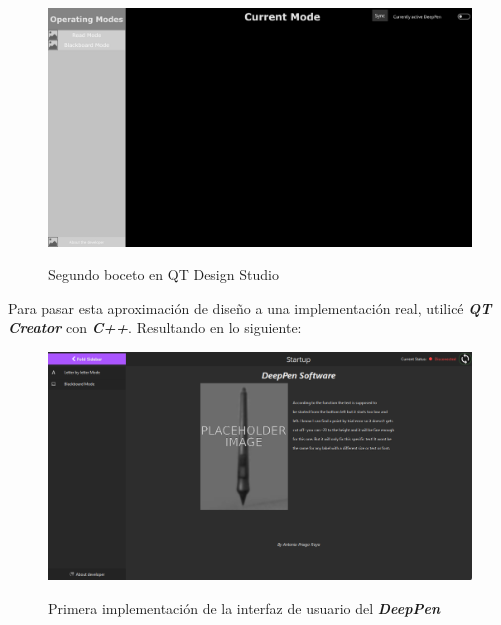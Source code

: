 \begin{figure}[h]
    \centering
    \includegraphics[width=1\textwidth]{capturas/DisenoUsuario2.png}\\[-0,40cm]
    \caption{Segundo boceto en QT Design Studio}
    \end{figure}

Para pasar esta aproximación de diseño a una implementación real, utilicé
\textbf{\textit{QT Creator}} con \textbf{\textit{C++}}. Resultando en lo siguiente:

\begin{figure}[h]
    \centering
    \includegraphics[width=1\textwidth]{capturas/Interfaz.png}\\[-0,40cm]
    \caption{Primera implementación de la interfaz de usuario del
    \textbf{\textit{DeepPen}}}
    \end{figure}

